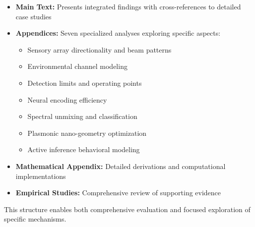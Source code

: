 \documentclass[
  13pt,
  a4paperpaper,
  12pt]{article}
\providecommand{\tightlist}{%
  \setlength{\itemsep}{0pt}\setlength{\parskip}{0pt}}
\begin{document}
\begin{itemize}
\item
  \textbf{Main Text:} Presents integrated findings with cross-references
  to detailed case studies
\item
  \textbf{Appendices:} Seven specialized analyses exploring specific
  aspects:

  \begin{itemize}
  \tightlist
  \item
    Sensory array directionality and beam patterns
  \item
    Environmental channel modeling 
  \item
    Detection limits and operating points
  \item
    Neural encoding efficiency 
  \item
    Spectral unmixing and classification
  \item
    Plasmonic nano-geometry optimization
  \item
    Active inference behavioral modeling 
  \end{itemize}
\item
  \textbf{Mathematical Appendix:} Detailed derivations and computational
  implementations 
\item
  \textbf{Empirical Studies:} Comprehensive review of supporting
  evidence 
\end{itemize}

This structure enables both comprehensive evaluation and focused
exploration of specific mechanisms.
\end{document}
